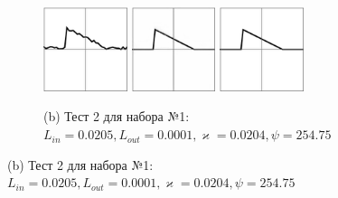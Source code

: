 \documentclass[12pt, a4paper]{article}
\renewcommand{\kappa}{\varkappa}
\begin{document}
\begin{figure}[!hp]
	\vspace{1em}
	\begin{subfigure}{\textwidth}
		\centering
		\includegraphics[width=0.27\textwidth]{res_n1_3}
		\hfill
		\includegraphics[width=0.27\textwidth]{res_n1_4}
		\hfill
		\includegraphics[width=0.27\textwidth]{2}
		\caption*{\small (b) Тест 2 для набора №1: $L_{in} = 0.0205, 
		L_{out} = 0.0001,
		 \kappa = 0.0204,
		 \psi = 254.75
		  $}
	\end{subfigure}
	

\end{figure}
\end{document}
